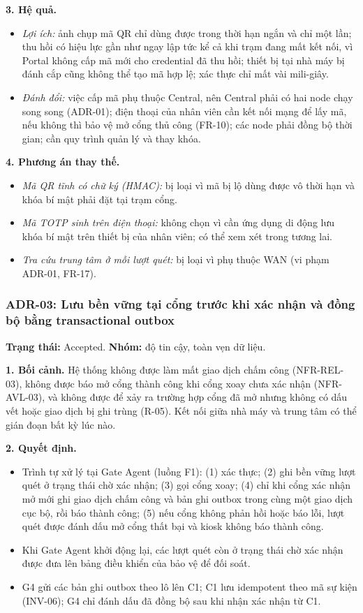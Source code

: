 \noindent\textbf{3. Hệ quả.}
\begin{itemize}
    \item \textit{Lợi ích:} ảnh chụp mã QR chỉ dùng được trong thời hạn ngắn và chỉ một lần; thu hồi có hiệu lực gần như ngay lập tức kể cả khi trạm đang mất kết nối, vì Portal không cấp mã mới cho credential đã thu hồi; thiết bị tại nhà máy bị đánh cắp cũng không thể tạo mã hợp lệ; xác thực chỉ mất vài mili-giây.
    \item \textit{Đánh đổi:} việc cấp mã phụ thuộc Central, nên Central phải có hai node chạy song song (ADR-01); điện thoại của nhân viên cần kết nối mạng để lấy mã, nếu không thì bảo vệ mở cổng thủ công (FR-10); các node phải đồng bộ thời gian; cần quy trình quản lý và thay khóa.
\end{itemize}

\noindent\textbf{4. Phương án thay thế.}
\begin{itemize}
    \item \textit{Mã QR tĩnh có chữ ký (HMAC):} bị loại vì mã bị lộ dùng được vô thời hạn và khóa bí mật phải đặt tại trạm cổng.
    \item \textit{Mã TOTP sinh trên điện thoại:} không chọn vì cần ứng dụng di động lưu khóa bí mật trên thiết bị của nhân viên; có thể xem xét trong tương lai.
    \item \textit{Tra cứu trung tâm ở mỗi lượt quét:} bị loại vì phụ thuộc WAN (vi phạm ADR-01, FR-17).
\end{itemize}

\subsubsection{ADR-03: Lưu bền vững tại cổng trước khi xác nhận và đồng bộ bằng transactional outbox}\label{adr:03}
\textbf{Trạng thái:} Accepted. \textbf{Nhóm:} độ tin cậy, toàn vẹn dữ liệu.

\noindent\textbf{1. Bối cảnh.} Hệ thống không được làm mất giao dịch chấm công (NFR-REL-03), không được báo mở cổng thành công khi cổng xoay chưa xác nhận (NFR-AVL-03), và không được để xảy ra trường hợp cổng đã mở nhưng không có dấu vết hoặc giao dịch bị ghi trùng (R-05). Kết nối giữa nhà máy và trung tâm có thể gián đoạn bất kỳ lúc nào.

\noindent\textbf{2. Quyết định.}
\begin{itemize}
    \item Trình tự xử lý tại Gate Agent (luồng F1): (1) xác thực; (2) ghi bền vững lượt quét ở trạng thái chờ xác nhận; (3) gọi cổng xoay; (4) chỉ khi cổng xác nhận mở mới ghi giao dịch chấm công và bản ghi outbox trong cùng một giao dịch cục bộ, rồi báo thành công; (5) nếu cổng không phản hồi hoặc báo lỗi, lượt quét được đánh dấu mở cổng thất bại và kiosk không báo thành công.
    \item Khi Gate Agent khởi động lại, các lượt quét còn ở trạng thái chờ xác nhận được đưa lên bảng điều khiển của bảo vệ để đối soát.
    \item G4 gửi các bản ghi outbox theo lô lên C1; C1 lưu idempotent theo mã sự kiện (INV-06); G4 chỉ đánh dấu đã đồng bộ sau khi nhận xác nhận từ C1.
\end{itemize}

